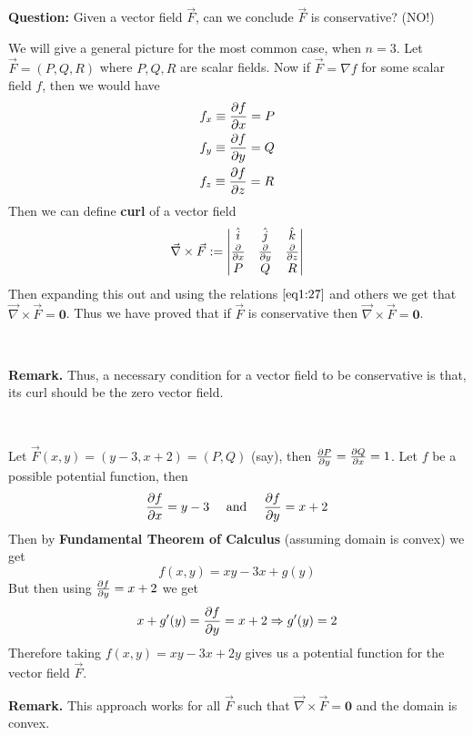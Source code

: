 \documentclass[../Analysis-3]{subfiles}
\begin{document}
\textbf{Question:} Given a vector field $\vec{F}$, can we conclude $\vec{F}$ is conservative? (NO!)

We will give a general picture for the most common case, when $n = 3$. Let $\vec{F} = (P,Q,R)$ where $P,Q,R$ are scalar fields. Now if $\vec{F} = \nabla f$ for some scalar field $f$, then we would have
\begin{align}\label{eq1:27}
     & f_x \equiv \pdv{f}{x} = P \\
     & f_y \equiv \pdv{f}{y} = Q \\
     & f_z \equiv \pdv{f}{z} = R
\end{align}
Then we can define \textbf{curl} of a vector field
\[
    \vec{\nabla} \times \vec{F} := \begin{vmatrix}
        \hat{i}   & \hat{j}   & \hat{k}   \\
        \pdv{}{x} & \pdv{}{y} & \pdv{}{z} \\
        P         & Q         & R
    \end{vmatrix}
\]
Then expanding this out and using the relations $\ref{eq1:27}$ and others we get that $\vec{\nabla} \times \vec{F} = \mathbf{0}$. Thus we have proved that if $\vec{F}$ is conservative then $\vec{\nabla} \times \vec{F} = \mathbf{0}$.

\

\textbf{Remark.} Thus, a necessary condition for a vector field to be conservative is that, its curl should be the zero vector field.

\

\begin{Eg}{}{}
    Let $\vec{F}(x,y) = (y-3,x+2) = (P,Q)$ (say), then $\pdv{P}{y} = \pdv{Q}{x} = 1$. Let $f$ be a possible potential function, then
    \[
        \pdv{f}{x} = y-3 \quad \mbox{ and } \quad \pdv{f}{y} = x+2
    \]
    Then by \textbf{Fundamental Theorem of Calculus} (assuming domain is convex) we get
    \[
        f(x,y) = xy - 3x + g(y)
    \]
    But then using $\pdv{f}{y} = x+2$ we get
    \[
        x + g'(y) = \pdv{f}{y} = x+2 \Rightarrow g'(y) = 2
    \]
    Therefore taking $f(x,y) = xy - 3x + 2y$ gives us a potential function for the vector field $\vec{F}$.
\end{Eg}


\textbf{Remark.} This approach works for all $\vec{F}$ such that $\vec{\nabla} \times \vec{F} = \mathbf{0}$ and the domain is convex.
\end{document}

